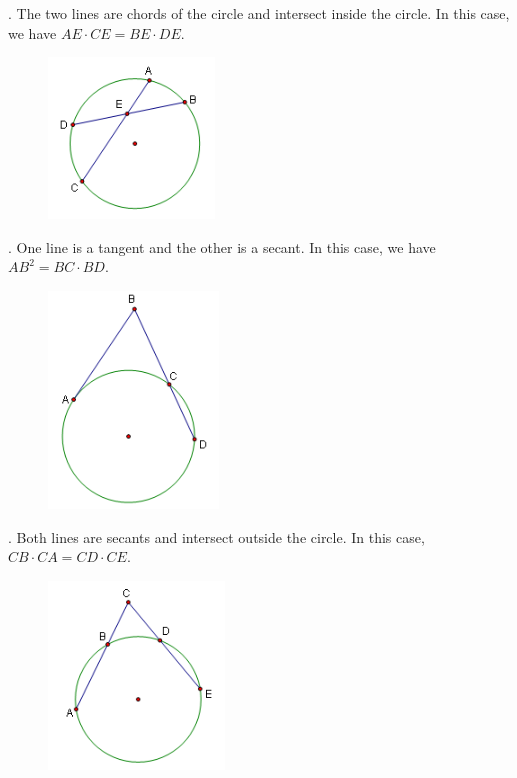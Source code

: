 \documentclass{article}
\begin{document}
            . The two lines are chords of the circle and intersect inside the circle.
            In this case, we have $AE\cdot CE = BE\cdot DE$. \\

            \begin{figure} [hbt!]
                \centering
                \includegraphics[scale=0.75]{Resources/Unit4Circles/power1.PNG}
            \end{figure}

            . One line is a tangent and the other is a secant. In this case, we have
            $AB^2=BC\cdot BD$. \\

            \begin{figure} [hbt!]
                \centering
                \includegraphics[scale=0.75]{Resources/Unit4Circles/power2.PNG}
            \end{figure}

            \pagebreak
            . Both lines are secants and intersect outside the circle. In this case,
            $CB\cdot CA = CD\cdot CE$. \\

            \begin{figure} [hbt!]
                \centering
                \includegraphics[scale=0.75]{Resources/Unit4Circles/power3.PNG}
            \end{figure}
\end{document}

